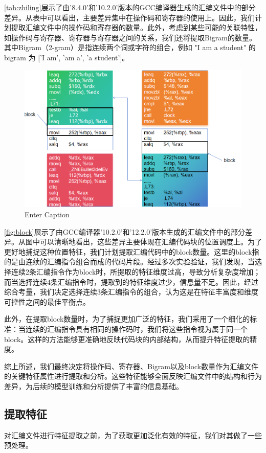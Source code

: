 \autoref{tab:zhiling}展示了由'8.4.0'和'10.2.0'版本的GCC编译器生成的汇编文件中的部分差异。从表中可以看出，主要差异集中在操作码和寄存器的使用上。因此，我们计划提取汇编文件中的操作码和寄存器的数量。此外，考虑到某些可能的关联特性，如操作码与寄存器、寄存器与寄存器之间的关系，我们还将提取Bigram的数量。其中Bigram（2-gram）是指连续两个词或字符的组合，例如 "I am a student" 的 bigram 为 ['I am', 'am a', 'a student']。
\begin{figure}[H]
    \centering
    \includegraphics[width=0.75\linewidth]{figures/block.png}
    \caption{Enter Caption}
    \label{fig:block}
\end{figure}


  \autoref{fig:block}展示了由GCC编译器'10.2.0'和'12.2.0'版本生成的汇编文件中的部分差异。从图中可以清晰地看出，这些差异主要体现在汇编代码块的位置调度上。为了更好地捕捉这种位置特征，我们计划提取汇编代码中的block数量。这里的block指的是由连续的汇编指令组合而成的代码片段。经过多次实验验证，我们发现，当选择连续2条汇编指令作为block时，所提取的特征维度过高，导致分析复杂度增加；而当选择连续4条汇编指令时，提取到的特征维度过少，信息量不足。因此，经过综合考量，我们决定选择连续3条汇编指令的组合，认为这是在特征丰富度和维度可控性之间的最佳平衡点。

此外，在提取block数量时，为了捕捉更加广泛的特征，我们采用了一个细化的标准：当连续的汇编指令具有相同的操作码时，我们将这些指令视为属于同一个block。这样的方法能够更准确地反映代码块的内部结构，从而提升特征提取的精度。

  综上所述，我们最终决定将操作码、寄存器、Bigram以及block数量作为汇编文件的关键特征属性进行提取和分析。这些特征能够全面反映汇编文件中的结构和行为差异，为后续的模型训练和分析提供了丰富的信息基础。
  \vspace{1cm}

  \subsection{提取特征}
  对汇编文件进行特征提取之前，为了获取更加泛化有效的特征，我们对其做了一些预处理。

